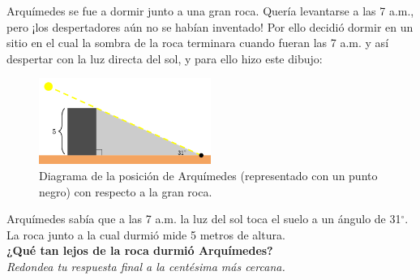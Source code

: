 \question[25] Arquímedes se fue a dormir junto a una gran roca. Quería levantarse a las 7 a.m., pero ¡los
despertadores aún no se habían inventado! Por ello decidió dormir en un sitio en el cual la sombra de
la roca terminara cuando fueran las 7 a.m. y así despertar con la luz directa del sol, y para ello hizo este dibujo:
\begin{figure}[H]
    \begin{center}
        \includegraphics[width=0.5\textwidth]{../images/arquimedes.png}
    \end{center}
    \caption{Diagrama de la posición de Arquímedes (representado con un punto negro) con respecto a la gran roca.}
    \label{fig:arquimedes}
\end{figure}
Arquímedes sabía que a las 7 a.m. la luz del sol toca el suelo a un ángulo de 31$^\circ$.
La roca junto a la cual durmió mide 5 metros de altura.\\
\textbf{¿Qué tan lejos de la roca durmió Arquímedes?}\\
\textit{Redondea tu respuesta final a la centésima más cercana.}